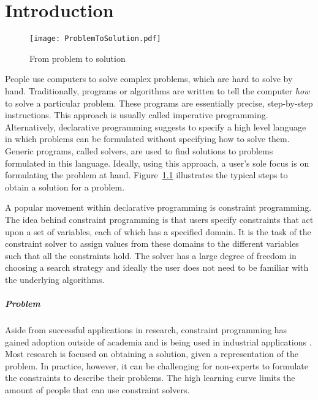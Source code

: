\chapter{Introduction}
\label{cha:intro}

\begin{figure}

	\caption{From problem to solution}
	\centering
		\texttt{[image: ProblemToSolution.pdf]}
	\label{fig:problem_to_solution}

\end{figure}

People use computers to solve complex problems, which are hard to solve by hand. Traditionally, programs or algorithms are written to tell the computer \emph{how} to solve a particular problem. These programs are essentially precise, step-by-step instructions. This approach is usually called imperative programming. Alternatively, declarative programming suggests to specify a high level language in which problems can be formulated without specifying how to solve them. Generic programs, called solvers, are used to find solutions to problems formulated in this language.
Ideally, using this approach, a user's sole focus is on formulating the problem at hand. Figure~\ref{fig:problem_to_solution} illustrates the typical steps to obtain a solution for a problem.

A popular movement within declarative programming is constraint programming. The idea behind constraint programming is that users specify constraints that act upon a set of variables, each of which has a specified domain. It is the task of the constraint solver to assign values from these domains to the different variables such that all the constraints hold. The solver has a large degree of freedom in choosing a search strategy and ideally the user does not need to be familiar with the underlying algorithms.

\paragraph{Problem}
Aside from successful applications in research, constraint programming has gained adoption outside of academia and is being used in industrial applications \cite{Simonis:IndustrialApplicationsCP}. Most research is focused on obtaining a solution, given a representation of the problem. In practice, however, it can be challenging for non-experts to formulate the constraints to describe their problems. The high learning curve limits the amount of people that can use constraint solvers.


